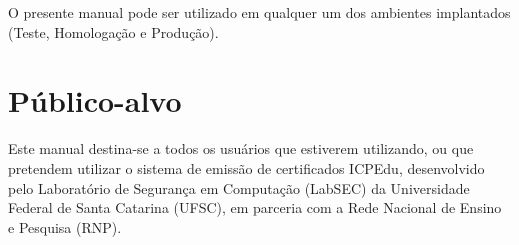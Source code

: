 O presente manual pode ser utilizado em qualquer um dos ambientes implantados (Teste, Homologação e Produção). 

\section{Público-alvo}

Este manual destina-se a todos os usuários que estiverem utilizando, ou que pretendem utilizar o sistema de emissão de certificados ICPEdu, desenvolvido pelo Laboratório de Segurança em Computação (LabSEC) da Universidade Federal de Santa Catarina (UFSC), em parceria com a Rede Nacional de Ensino e Pesquisa (RNP).

\nocite{*}